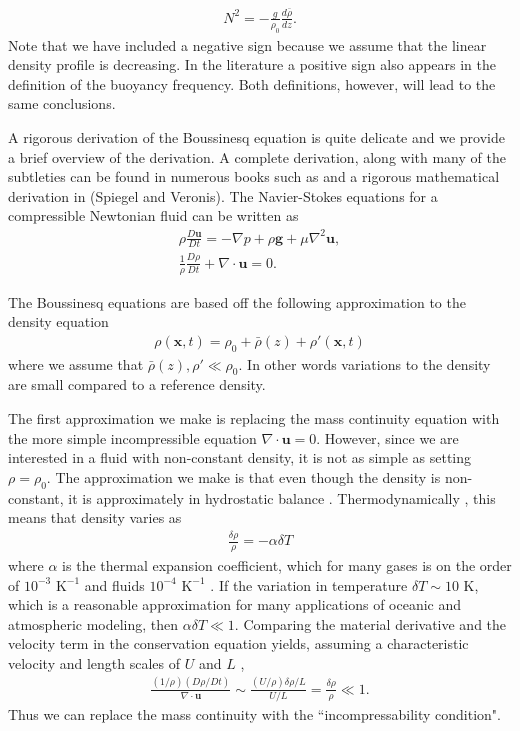 \begin{align}
N^{2} = -\frac{g}{\rho_{0}}\frac{d\bar{\rho}}{dz}.
\end{align}
Note that we have included a negative sign because we assume that the linear density profile is decreasing. In the literature a positive sign also appears in the definition of the buoyancy frequency. Both definitions, however, will lead to the same conclusions. 

A rigorous derivation of the Boussinesq equation is quite delicate and we provide a brief overview of the derivation. A complete derivation, along with many of the subtleties can be found in numerous books such as \cite{kundu,tritton,vallis} and a rigorous mathematical derivation in (Spiegel and Veronis). The Navier-Stokes equations for a compressible Newtonian fluid can be written as
\begin{align}
\rho \frac{D\bm{u}}{Dt} = -\nabla p + \rho \textbf{g} + \mu \nabla^{2}\bm{u},\\
\frac{1}{\rho}\frac{D\rho}{Dt} + \nabla \cdot \bm{u}=0.
\end{align}

The Boussinesq equations are based off the following approximation to the density equation \cite{kundu,vallis}
\begin{align}
\rho(\bm{x},t) = \rho_{0} + \bar{\rho}(z) + \rho'(\bm{x},t) 
\end{align}
where we assume that $\bar{\rho}(z), \rho' \ll \rho_{0}$. In other words variations to the density are small compared to a reference density.

The first approximation we make is replacing the mass continuity equation with the more simple incompressible equation $\nabla\cdot \bm{u}=0$. However,  since we are interested in a fluid with non-constant density, it is not as simple as setting $\rho=\rho_{0}$. The approximation we make is that even though the density is non-constant, it is approximately in hydrostatic balance \cite{vallis}. Thermodynamically \cite{kundu}, this means that density varies as
\begin{align}
\frac{\delta \rho}{\rho} = - \alpha \delta T
\end{align} 
where $\alpha$ is the thermal expansion coefficient, which for many gases is on the order of $10^{-3} \text{ K}^{-1}$ and fluids $10^{-4} \text{ K}^{-1}$ \cite{kundu}. If the variation in temperature $\delta T \sim 10 \text{ K}$, which is a reasonable approximation for many applications of oceanic and atmospheric modeling, then $\alpha \delta T\ll 1$. Comparing the material derivative and the velocity term in the conservation equation yields, assuming a characteristic velocity and length scales of $U$ and $L$ \cite{kundu}, 
\begin{align}
\frac{(1/\rho)(D\rho/Dt)}{\nabla \cdot\textbf{u}} \sim \frac{(U/\rho)\delta \rho / L}{U/L}  = \frac{\delta\rho}{\rho} \ll 1.
\end{align}
Thus we can replace the mass continuity with the ``incompressability condition". 


